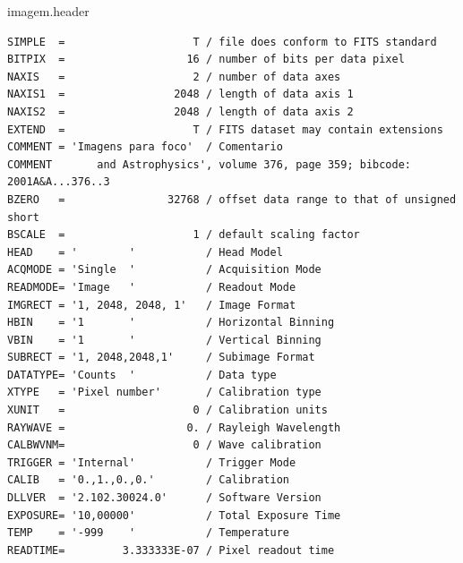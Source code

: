 \documentclass[
  letterpaper,
  DIV=11,
  numbers=noendperiod]{scrreprt}
\newenvironment{Shaded}{\begin{snugshade}}{\end{snugshade}}
\newcommand{\NormalTok}[1]{\textcolor[rgb]{0.00,0.23,0.31}{#1}}
\begin{document}
\begin{Shaded}
\begin{Highlighting}[]
\NormalTok{imagem.header}
\end{Highlighting}
\end{Shaded}

\begin{verbatim}
SIMPLE  =                    T / file does conform to FITS standard             
BITPIX  =                   16 / number of bits per data pixel                  
NAXIS   =                    2 / number of data axes                            
NAXIS1  =                 2048 / length of data axis 1                          
NAXIS2  =                 2048 / length of data axis 2                          
EXTEND  =                    T / FITS dataset may contain extensions            
COMMENT = 'Imagens para foco'  / Comentario                                     
COMMENT       and Astrophysics', volume 376, page 359; bibcode: 2001A&A...376..3
BZERO   =                32768 / offset data range to that of unsigned short    
BSCALE  =                    1 / default scaling factor                         
HEAD    = '        '           / Head Model                                     
ACQMODE = 'Single  '           / Acquisition Mode                               
READMODE= 'Image   '           / Readout Mode                                   
IMGRECT = '1, 2048, 2048, 1'   / Image Format                                   
HBIN    = '1       '           / Horizontal Binning                             
VBIN    = '1       '           / Vertical Binning                               
SUBRECT = '1, 2048,2048,1'     / Subimage Format                                
DATATYPE= 'Counts  '           / Data type                                      
XTYPE   = 'Pixel number'       / Calibration type                               
XUNIT   =                    0 / Calibration units                              
RAYWAVE =                   0. / Rayleigh Wavelength                            
CALBWVNM=                    0 / Wave calibration                               
TRIGGER = 'Internal'           / Trigger Mode                                   
CALIB   = '0.,1.,0.,0.'        / Calibration                                    
DLLVER  = '2.102.30024.0'      / Software Version                               
EXPOSURE= '10,00000'           / Total Exposure Time                            
TEMP    = '-999    '           / Temperature                                    
READTIME=         3.333333E-07 / Pixel readout time                             

\end{verbatim}
\end{document}
